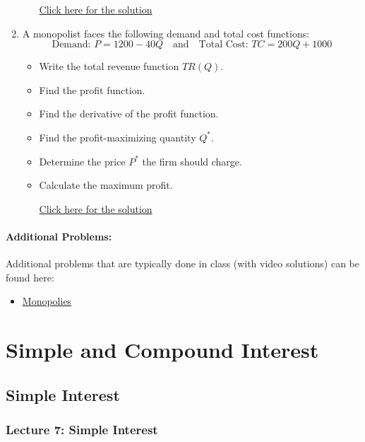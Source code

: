 \documentclass[
]{book}
\providecommand{\tightlist}{%
  \setlength{\itemsep}{0pt}\setlength{\parskip}{0pt}}
\begin{document}
\begin{enumerate}
\begin{itemize}
    \href{hhttps://youtu.be/g207cVSDu6Q}{Click here for the solution}
  \end{itemize}
\item
  A monopolist faces the following demand and total cost functions:
  \[
      \text{Demand: } P = 1200 - 40Q \quad \text{and} \quad \text{Total Cost: } TC = 200Q + 1000
      \]

  \begin{itemize}
  \tightlist
  \item
    Write the total revenue function \(TR(Q)\).
  \item
    Find the profit function.
  \item
    Find the derivative of the profit function.
  \item
    Find the profit-maximizing quantity \(Q^*\).
  \item
    Determine the price \(P^*\) the firm should charge.
  \item
    Calculate the maximum profit.

    \href{https://youtu.be/AZx5xSc00rI}{Click here for the solution}
  \end{itemize}
\end{enumerate}

\subsection*{Additional Problems:}\label{additional-problems-5}

Additional problems that are typically done in class (with video solutions) can be found here:

\begin{itemize}
\tightlist
\item
  \href{https://theelementsmath.github.io/M114/business-economics.html\#monopoly}{Monopolies}
\end{itemize}

\part{Simple and Compound Interest}\label{part-simple-and-compound-interest}

\chapter{Simple Interest}\label{simple-interest}

\section*{Lecture 7: Simple Interest}\label{lecture-7-simple-interest}
\end{document}
